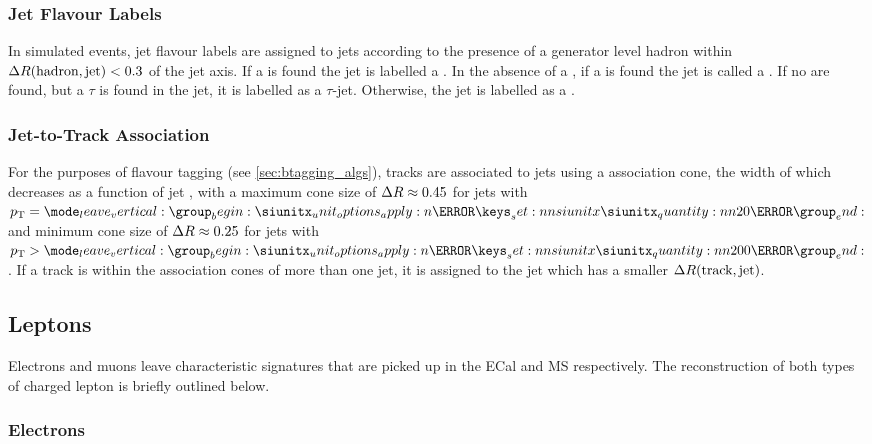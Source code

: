 \subsubsection{Jet Flavour Labels}
In simulated events, jet flavour labels are assigned to \smallR jets according to the presence of a generator level hadron within ${\Delta R(\text{hadron},\text{jet})<0.3}$ of the jet axis. If a \bhadron is found the jet is labelled a \bjet. In the absence of a \bhadron, if a \chadron is found the jet is called a \cjet.
If no \borchadrons are found, but a $\tau$ is found in the jet, it is labelled as a $\tau$-jet.
Otherwise, the jet is labelled as a \ljet.

\subsubsection{Jet-to-Track Association}
For the purposes of flavour tagging (see \cref{sec:btagging_algs}), tracks are associated to \smallR jets using a \DeltaR association cone, the width of which decreases as a function of jet \pt, with a maximum cone size of $\Delta R \approx 0.45$ for jets with $\pt = \SI{20}{\GeV}$ and minimum cone size of $\Delta R \approx 0.25$ for jets with $\pt > \SI{200}{\GeV}$. 
If a track is within the association cones of more than one jet, it is assigned to the jet which has a smaller $\Delta R(\text{track}, \text{jet})$.


\subsection{Leptons}\label{sec:lepton_reco}

Electrons and muons leave characteristic signatures that are picked up in the ECal and MS respectively.
The reconstruction of both types of charged lepton is briefly outlined below.

\subsubsection{Electrons}

